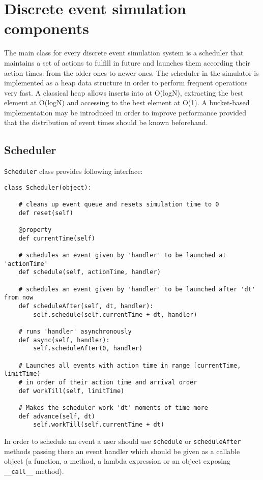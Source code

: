 \documentclass[a4paper,11pt]{article}
\begin{document}
\section{Discrete event simulation
components}\label{discrete-event-simulation-components}

The main class for every discrete event simulation system is a scheduler
that maintains a set of actions to fulfill in future and launches them
according their action times: from the older ones to newer ones. The
scheduler in the simulator is implemented as a heap data structure in
order to perform frequent operations very fast. A classical heap allows
inserts into at O(logN), extracting the best element at O(logN) and
accessing to the best element at O(1). A bucket-based implementation may
be introduced in order to improve performance provided that the
distribution of event times should be known beforehand.

\subsection{Scheduler}\label{scheduler}

\texttt{Scheduler} class provides following interface:
\begin{verbatim}
class Scheduler(object):

    # cleans up event queue and resets simulation time to 0
    def reset(self)

    @property
    def currentTime(self)

    # schedules an event given by 'handler' to be launched at 'actionTime'
    def schedule(self, actionTime, handler)

    # schedules an event given by 'handler' to be launched after 'dt' from now
    def scheduleAfter(self, dt, handler):
        self.schedule(self.currentTime + dt, handler)

    # runs 'handler' asynchronously
    def async(self, handler):
        self.scheduleAfter(0, handler)

    # Launches all events with action time in range [currentTime, limitTime)
    # in order of their action time and arrival order
    def workTill(self, limitTime)

    # Makes the scheduler work 'dt' moments of time more
    def advance(self, dt)
        self.workTill(self.currentTime + dt)
\end{verbatim}

In order to schedule an event a user should use \texttt{schedule} or
\texttt{scheduleAfter} methods passing there an event handler which
should be given as a callable object (a function, a method, a lambda
expression or an object exposing \texttt{\_\_call\_\_} method).
\end{document}
